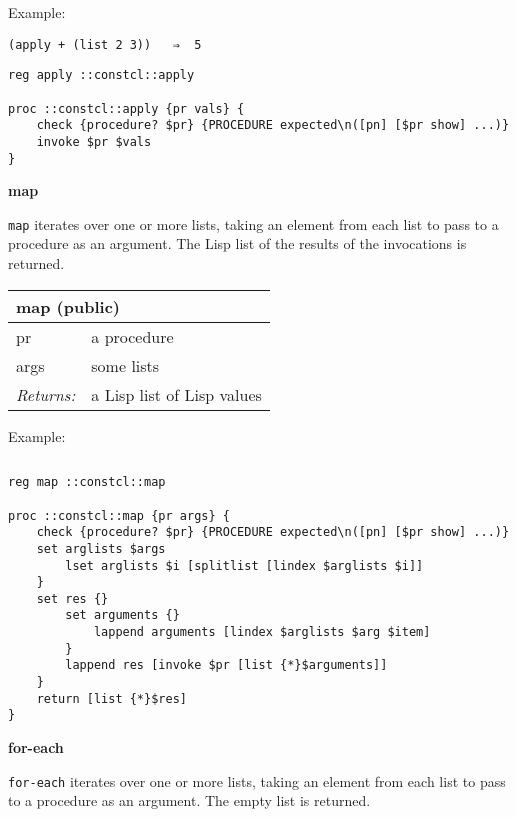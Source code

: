 \documentclass{report}
\begin{document}
Example:

\noindent\makebox[\linewidth]{\rule{\linewidth}{0.4pt}}
\begin{lstlisting}
(apply + (list 2 3))   ⇒  5
\end{lstlisting}
\noindent\makebox[\linewidth]{\rule{\linewidth}{0.4pt}}
\noindent\makebox[\linewidth]{\rule{\linewidth}{0.4pt}}
\begin{lstlisting}
reg apply ::constcl::apply
 
proc ::constcl::apply {pr vals} {
    check {procedure? $pr} {PROCEDURE expected\n([pn] [$pr show] ...)}
    invoke $pr $vals
}
\end{lstlisting}
\noindent\makebox[\linewidth]{\rule{\linewidth}{0.4pt}}

\textbf{map}


\texttt{map} iterates over one or more lists, taking an element from each list to pass to a procedure as an argument. The Lisp list of the results of the invocations is returned.

\begin{tabular}{ |l l| }
\hline
\multicolumn{2}{|l|}{map (public)} \\
\hline
pr & a procedure \\
args & some lists \\
\textit{Returns:} & a Lisp list of Lisp values \\
\hline
\end{tabular}


Example:

\noindent\makebox[\linewidth]{\rule{\linewidth}{0.4pt}}
\begin{lstlisting}
\end{lstlisting}
\noindent\makebox[\linewidth]{\rule{\linewidth}{0.4pt}}
\noindent\makebox[\linewidth]{\rule{\linewidth}{0.4pt}}
\begin{lstlisting}
reg map ::constcl::map
 
proc ::constcl::map {pr args} {
    check {procedure? $pr} {PROCEDURE expected\n([pn] [$pr show] ...)}
    set arglists $args
        lset arglists $i [splitlist [lindex $arglists $i]]
    }
    set res {}
        set arguments {}
            lappend arguments [lindex $arglists $arg $item]
        }
        lappend res [invoke $pr [list {*}$arguments]]
    }
    return [list {*}$res]
}
\end{lstlisting}
\noindent\makebox[\linewidth]{\rule{\linewidth}{0.4pt}}

\textbf{for-each}


\texttt{for-each} iterates over one or more lists, taking an element from each list to pass to a procedure as an argument. The empty list is returned.
\end{document}
